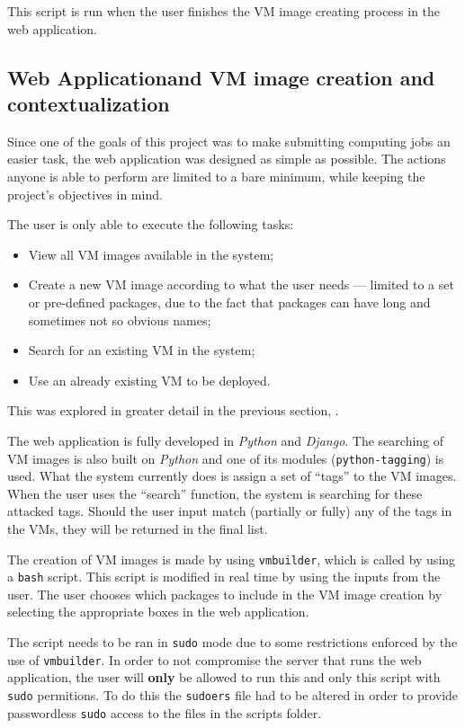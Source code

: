 This script is run when the user finishes the VM image creating process in the web application.

\subsection{Web Applicationand VM image creation and contextualization}\label{subsec:webapp}

Since one of the goals of this project was to make submitting computing jobs an easier task, the web application was designed as simple as possible. The actions anyone is able to perform are limited to a bare minimum, while keeping the project's objectives in mind.

The user is only able to execute the following tasks:

\begin{itemize}
\item View all VM images available in the system;
\item Create a new VM image according to what the user needs --- limited to a set or pre-defined packages, due to the fact that packages can have long and sometimes not so obvious names;
\item Search for an existing VM in the system;
\item Use an already existing VM to be deployed.
\end{itemize}

This was explored in greater detail in the previous section, .


The web application is fully developed in \textit{Python} and \textit{Django}. The searching of VM images is also built on \textit{Python} and one of its modules (\texttt{python-tagging}) is used. What the system currently does is assign a set of ``tags'' to the VM images. When the user uses the ``search'' function, the system is searching for these attacked tags. Should the user input match (partially or fully) any of the tags in the VMs, they will be returned in the final list.

The creation of VM images is made by using \texttt{vmbuilder}, which is called by using a \texttt{bash} script. This script is modified in real time by using the inputs from the user. The user chooses which packages to include in the VM image creation by selecting the appropriate boxes in the web application.

The script needs to be ran in \texttt{sudo} mode due to some restrictions enforced by the use of \texttt{vmbuilder}. In order to not compromise the server that runs the web application, the user will \textbf{only} be allowed to run this and only this script with \texttt{sudo} permitions.
To do this the \texttt{sudoers} file had to be altered in order to provide passwordless \texttt{sudo} access to the files in the scripts folder. 

